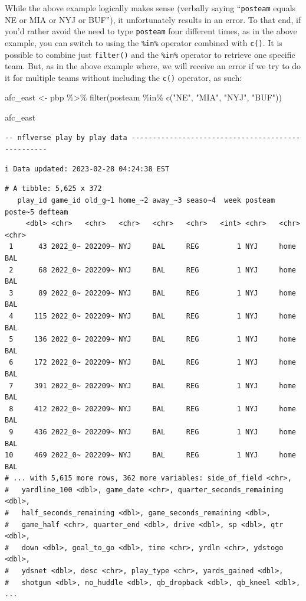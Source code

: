 \documentclass[
  letterpaper,
]{krantz}
\newenvironment{Shaded}{\begin{snugshade}}{\end{snugshade}}
\newcommand{\FunctionTok}[1]{\textcolor[rgb]{0.28,0.35,0.67}{#1}}
\newcommand{\NormalTok}[1]{\textcolor[rgb]{0.00,0.23,0.31}{#1}}
\newcommand{\OtherTok}[1]{\textcolor[rgb]{0.00,0.23,0.31}{#1}}
\newcommand{\SpecialCharTok}[1]{\textcolor[rgb]{0.37,0.37,0.37}{#1}}
\newcommand{\StringTok}[1]{\textcolor[rgb]{0.13,0.47,0.30}{#1}}
\begin{document}
While the above example logically makes sense (verbally saying
``\texttt{posteam} equals NE or MIA or NYJ or BUF''), it unfortunately
results in an error. To that end, if you'd rather avoid the need to type
\texttt{posteam} four different times, as in the above example, you can
switch to using the \texttt{\%in\%} operator combined with \texttt{c()}.
It is possible to combine just \texttt{filter()} and the \texttt{\%in\%}
operator to retrieve one specific team. But, as in the above example
where, we will receive an error if we try to do it for multiple teams
without including the \texttt{c()} operator, as such:

\begin{Shaded}
\begin{Highlighting}[]
\NormalTok{afc\_east }\OtherTok{\textless{}{-}}\NormalTok{ pbp }\SpecialCharTok{\%\textgreater{}\%}
  \FunctionTok{filter}\NormalTok{(posteam }\SpecialCharTok{\%in\%} \FunctionTok{c}\NormalTok{(}\StringTok{"NE"}\NormalTok{, }\StringTok{"MIA"}\NormalTok{, }\StringTok{"NYJ"}\NormalTok{, }\StringTok{"BUF"}\NormalTok{))}

\NormalTok{afc\_east}
\end{Highlighting}
\end{Shaded}

\begin{verbatim}
-- nflverse play by play data --------------------------------------------------
\end{verbatim}

\begin{verbatim}
i Data updated: 2023-02-28 04:24:38 EST
\end{verbatim}

\begin{verbatim}
# A tibble: 5,625 x 372
   play_id game_id old_g~1 home_~2 away_~3 seaso~4  week posteam poste~5 defteam
     <dbl> <chr>   <chr>   <chr>   <chr>   <chr>   <int> <chr>   <chr>   <chr>  
 1      43 2022_0~ 202209~ NYJ     BAL     REG         1 NYJ     home    BAL    
 2      68 2022_0~ 202209~ NYJ     BAL     REG         1 NYJ     home    BAL    
 3      89 2022_0~ 202209~ NYJ     BAL     REG         1 NYJ     home    BAL    
 4     115 2022_0~ 202209~ NYJ     BAL     REG         1 NYJ     home    BAL    
 5     136 2022_0~ 202209~ NYJ     BAL     REG         1 NYJ     home    BAL    
 6     172 2022_0~ 202209~ NYJ     BAL     REG         1 NYJ     home    BAL    
 7     391 2022_0~ 202209~ NYJ     BAL     REG         1 NYJ     home    BAL    
 8     412 2022_0~ 202209~ NYJ     BAL     REG         1 NYJ     home    BAL    
 9     436 2022_0~ 202209~ NYJ     BAL     REG         1 NYJ     home    BAL    
10     469 2022_0~ 202209~ NYJ     BAL     REG         1 NYJ     home    BAL    
# ... with 5,615 more rows, 362 more variables: side_of_field <chr>,
#   yardline_100 <dbl>, game_date <chr>, quarter_seconds_remaining <dbl>,
#   half_seconds_remaining <dbl>, game_seconds_remaining <dbl>,
#   game_half <chr>, quarter_end <dbl>, drive <dbl>, sp <dbl>, qtr <dbl>,
#   down <dbl>, goal_to_go <dbl>, time <chr>, yrdln <chr>, ydstogo <dbl>,
#   ydsnet <dbl>, desc <chr>, play_type <chr>, yards_gained <dbl>,
#   shotgun <dbl>, no_huddle <dbl>, qb_dropback <dbl>, qb_kneel <dbl>, ...
\end{verbatim}
\end{document}
